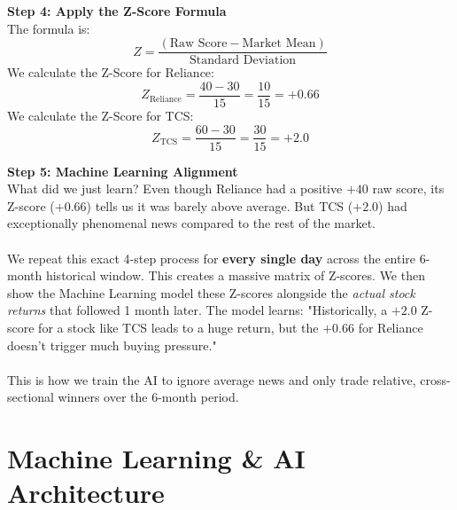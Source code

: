 \documentclass[11pt, a4paper]{article}
\begin{document}
\textbf{Step 4: Apply the Z-Score Formula} \\
The formula is: $$Z = \frac{(\text{Raw Score} - \text{Market Mean})}{\text{Standard Deviation}}$$
We calculate the Z-Score for Reliance:
$$Z_{\text{Reliance}} = \frac{40 - 30}{15} = \frac{10}{15} = +0.66$$
We calculate the Z-Score for TCS:
$$Z_{\text{TCS}} = \frac{60 - 30}{15} = \frac{30}{15} = +2.0$$

\textbf{Step 5: Machine Learning Alignment} \\
What did we just learn? Even though Reliance had a positive $+40$ raw score, its Z-score ($+0.66$) tells us it was barely above average. But TCS ($+2.0$) had exceptionally phenomenal news compared to the rest of the market.
\\ \\
We repeat this exact 4-step process for \textbf{every single day} across the entire 6-month historical window. This creates a massive matrix of Z-scores. We then show the Machine Learning model these Z-scores alongside the \textit{actual stock returns} that followed 1 month later. The model learns: "Historically, a $+2.0$ Z-score for a stock like TCS leads to a huge return, but the $+0.66$ for Reliance doesn't trigger much buying pressure." 
\\ \\
This is how we train the AI to ignore average news and only trade relative, cross-sectional winners over the 6-month period.

\section*{Machine Learning \& AI Architecture}
\end{document}
